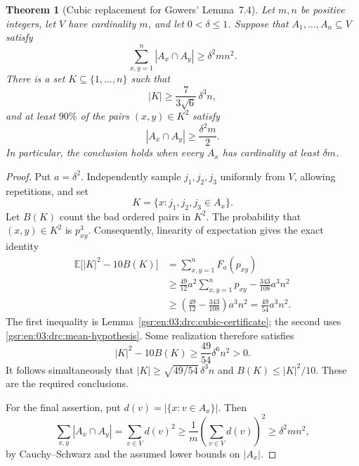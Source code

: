 \documentclass[11pt,letterpaper]{article}
\numberwithin{equation}{section}
\newtheorem{theorem}{Theorem}[section]
\theoremstyle{definition}
\theoremstyle{remark}
\newcommand{\E}{\mathbb E}
\newcommand{\1}{\mathbf 1}
\newcommand{\abs}[1]{\left|#1\right|}
\begin{document}
\begin{theorem}[Cubic replacement for Gowers' Lemma~7.4]
\label{gsr:en:03:drc:cubic-selection}
Let $m,n$ be positive integers, let $V$ have cardinality $m$, and let
$0<\delta\leq1$.  Suppose that $A_1,\ldots,A_n\subseteq V$ satisfy
\begin{equation}\label{gsr:en:03:drc:mean-hypothesis}
 \sum_{x,y=1}^n\abs{A_x\cap A_y}\geq\delta^2mn^2.
\end{equation}
There is a set $K\subseteq\{1,\ldots,n\}$ such that
\begin{equation}\label{gsr:en:03:drc:cubic-size}
 \abs K\geq\frac{7}{3\sqrt6}\,\delta^3n,
\end{equation}
and at least $90\%$ of the pairs $(x,y)\in K^2$ satisfy
\begin{equation}\label{gsr:en:03:drc:good-threshold}
 \abs{A_x\cap A_y}\geq\frac{\delta^2m}{2}.
\end{equation}
In particular, the conclusion holds when every $A_x$ has cardinality at
least $\delta m$.
\end{theorem}

\begin{proof}
Put $a=\delta^2$.  Independently sample $j_1,j_2,j_3$ uniformly from $V$,
allowing repetitions, and set
\[
 K=\{x:j_1,j_2,j_3\in A_x\}.
\]
Let $B(K)$ count the bad ordered pairs in $K^2$.  The probability that
$(x,y)\in K^2$ is $p_{xy}^3$.  Consequently, linearity of expectation
gives the exact identity
\begin{align*}
 \E\bigl[\abs K^2-10B(K)\bigr]
 &=\sum_{x,y=1}^n F_a(p_{xy})\\
 &\geq\frac{49}{12}a^2\sum_{x,y=1}^n p_{xy}
       -\frac{343}{108}a^3n^2\\
 &\geq\left(\frac{49}{12}-\frac{343}{108}\right)a^3n^2
  =\frac{49}{54}a^3n^2.
\end{align*}
The first inequality is Lemma~\ref{gsr:en:03:drc:cubic-certificate}; the second uses
\eqref{gsr:en:03:drc:mean-hypothesis}.  Some realization therefore satisfies
\[
 \abs K^2-10B(K)\geq\frac{49}{54}\delta^6n^2>0.
\]
It follows simultaneously that $\abs K\geq\sqrt{49/54}\,\delta^3n$ and
$B(K)\leq\abs K^2/10$.  These are the required conclusions.

For the final assertion, put $d(v)=\abs{\{x:v\in A_x\}}$.  Then
\[
 \sum_{x,y}\abs{A_x\cap A_y}
 =\sum_{v\in V}d(v)^2
 \geq\frac{1}{m}\left(\sum_{v\in V}d(v)\right)^2
 \geq\delta^2mn^2,
\]
by Cauchy--Schwarz and the assumed lower bounds on $\abs{A_x}$.
\end{proof}
\end{document}
